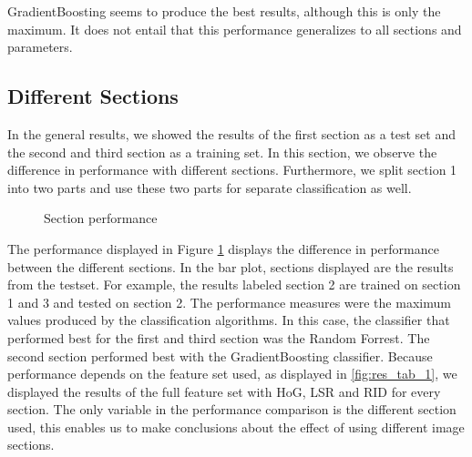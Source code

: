 GradientBoosting seems to produce the best results, although this is only the maximum. It does not entail that this performance generalizes to all sections and parameters.

\subsection{Different Sections}

In the general results, we showed the results of the first section as a test set and the second and third section as a training set. In this section, we observe the difference in performance with different sections. Furthermore, we split section 1 into two parts and use these two parts for separate classification as well.

\datatwo

\begin{figure}
	\caption{Section performance}
	\label{fig:res_bar_2}
\end{figure}

The performance displayed in Figure \ref{fig:res_bar_2} displays the difference in performance between the different sections. In the bar plot, sections displayed are the results from the testset. For example, the results labeled section 2 are trained on section 1 and 3 and tested on section 2. The performance measures were the maximum values produced by the classification algorithms. In this case, the classifier that performed best for the first and third section was the Random Forrest. The second section performed best with the GradientBoosting classifier. Because performance depends on the feature set used, as displayed in \ref{fig:res_tab_1}, we displayed the results of the full feature set with HoG, LSR and RID for every section. The only variable in the performance comparison is the different section used, this enables us to make conclusions about the effect of using different image sections.


